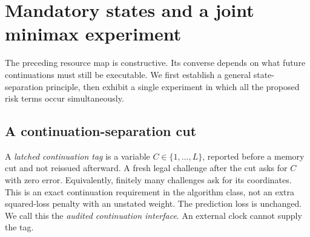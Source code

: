 \section{Mandatory states and a joint minimax experiment}\label{sec:minimax}
The preceding resource map is constructive. Its converse depends on what future continuations must still be executable. We first establish a general state-separation principle, then exhibit a single experiment in which all the proposed risk terms occur simultaneously.

\subsection{A continuation-separation cut}
A \emph{latched continuation tag} is a variable $C\in\{1,\ldots,L\}$, reported before a memory cut and not reissued afterward. A fresh legal challenge after the cut asks for $C$ with zero error. Equivalently, finitely many challenges ask for its coordinates. This is an exact continuation requirement in the algorithm class, not an extra squared-loss penalty with an unstated weight. The prediction loss is unchanged. We call this the \emph{audited continuation interface}. An external clock cannot supply the tag.

